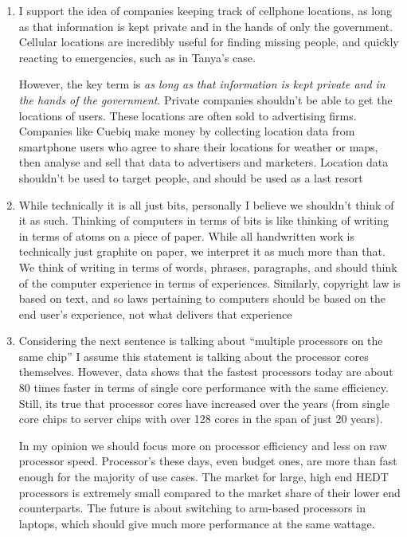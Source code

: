 \documentclass[11pt]{article}
\begin{document}
\begin{enumerate}
\item I support the idea of companies keeping track of cellphone locations, as long
as that information is kept private and in the hands of only the government.
Cellular locations are incredibly useful for finding missing people, and
quickly reacting to emergencies, such as in Tanya's case.

However, the key term is \emph{as long as that information is kept private and in
the hands of the government}. Private companies shouldn't be able to get the
locations of users. These locations are often sold to advertising firms.
Companies like Cuebiq make money by collecting location data from smartphone
users who agree to share their locations for weather or maps, then analyse
and sell that data to advertisers and marketers. Location data shouldn't be
used to target people, and should be used as a last resort

\item While technically it is all just bits, personally I believe we shouldn't
think of it as such. Thinking of computers in terms of bits is like thinking
of writing in terms of atoms on a piece of paper. While all handwritten work
is technically just graphite on paper, we interpret it as much more than
that. We think of writing in terms of words, phrases, paragraphs, and should
think of the computer experience in terms of experiences. Similarly,
copyright law is based on text, and so laws pertaining to computers should be
based on the end user's experience, not what delivers that experience

\item Considering the next sentence is talking about ``multiple processors on the
same chip'' I assume this statement is talking about the processor cores
themselves. However, data shows that the fastest processors today are about
80 times faster in terms of single core performance with the same efficiency.
Still, its true that processor cores have increased over the years (from
single core chips to server chips with over 128 cores in the span of just 20
years).

In my opinion we should focus more on processor efficiency and less on raw
processor speed. Processor's these days, even budget ones, are more than fast
enough for the majority of use cases. The market for large, high end HEDT
processors is extremely small compared to the market share of their lower end
counterparts. The future is about switching to arm-based processors in
laptops, which should give much more performance at the same wattage.


\end{enumerate}
\end{document}
